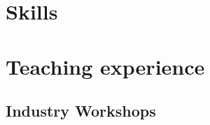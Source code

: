 \documentclass[11pt,a4paper,]{awesome-cv}
\begin{document}
\hypertarget{skills}{%
\section{Skills}\label{skills}}

\begin{cvhonors}
\end{cvhonors}

\hypertarget{teaching-experience}{%
\section{Teaching experience}\label{teaching-experience}}

\newpage

\hypertarget{industry-workshops}{%
\subsection{Industry Workshops}\label{industry-workshops}}
\end{document}
